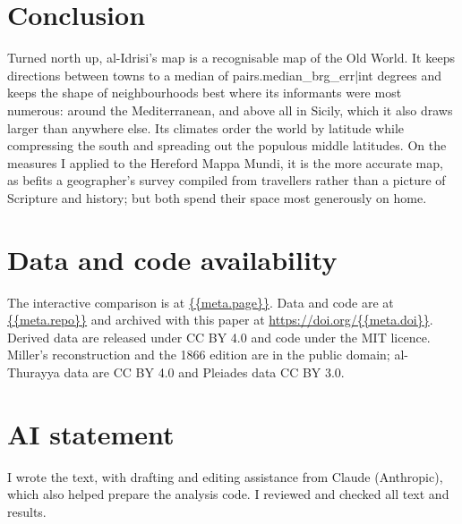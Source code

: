 \documentclass[11pt,a4paper]{article}
\begin{document}
\section{Conclusion}
Turned north up, al-Idrisi's map is a recognisable map of the Old World. It keeps directions between towns to a median of {{pairs.median_brg_err|int}} degrees and keeps the shape of neighbourhoods best where its informants were most numerous: around the Mediterranean, and above all in Sicily, which it also draws larger than anywhere else. Its climates order the world by latitude while compressing the south and spreading out the populous middle latitudes. On the measures I applied to the Hereford Mappa Mundi, it is the more accurate map, as befits a geographer's survey compiled from travellers rather than a picture of Scripture and history; but both spend their space most generously on home.

\section*{Data and code availability}
The interactive comparison is at \url{{{meta.page}}}. Data and code are at \url{{{meta.repo}}} and archived with this paper at \url{https://doi.org/{{meta.doi}}}. Derived data are released under CC BY 4.0 and code under the MIT licence. Miller's reconstruction and the 1866 edition are in the public domain; al-Thurayya data are CC BY 4.0 and Pleiades data CC BY 3.0.

\section*{AI statement}
I wrote the text, with drafting and editing assistance from Claude (Anthropic), which also helped prepare the analysis code. I reviewed and checked all text and results.
\end{document}
